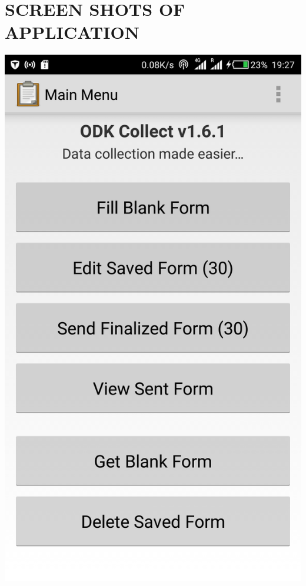 \documentclass[12pt,letterpaper]{article}
\begin{document}
{		\section{SCREEN SHOTS OF APPLICATION}
		\includegraphics[scale=0.1]{cccc}
}
\end{document}
